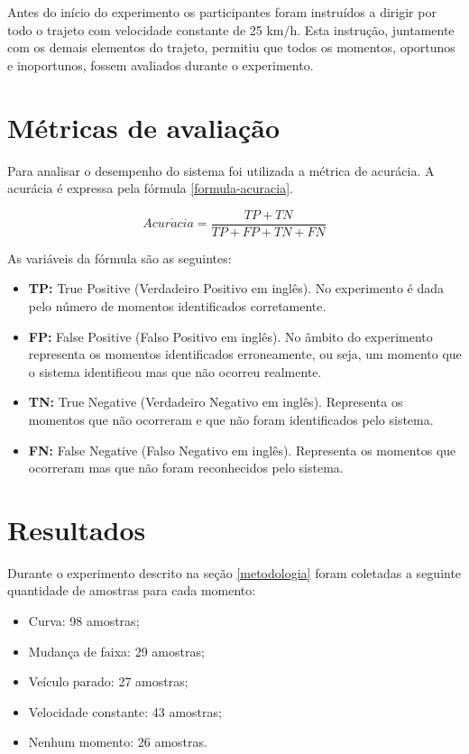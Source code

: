 Antes do início do experimento os participantes foram instruídos a dirigir por todo o trajeto com
velocidade constante de 25 km/h. Esta instrução, juntamente com os demais elementos do trajeto,
permitiu que todos os momentos, oportunos e inoportunos, fossem avaliados durante o experimento.

\section{Métricas de avaliação}
\label{metricas}

Para analisar o desempenho do sistema foi utilizada a métrica de acurácia. A acurácia é expressa pela
fórmula \ref{formula-acuracia}.

\begin{equation}
  Acur\acute{a}cia = \frac{TP + TN}{TP + FP + TN + FN}
\label{formula-acuracia}
\end{equation}

As variáveis da fórmula são as seguintes:

\begin{itemize}
  \item \textbf{TP:} True Positive (Verdadeiro Positivo em inglês). No experimento é dada pelo número de
  momentos identificados corretamente.
  \item \textbf{FP:} False Positive (Falso Positivo em inglês). No âmbito do experimento representa os
  momentos identificados erroneamente, ou seja, um momento que o sistema identificou mas que não ocorreu
  realmente.
  \item \textbf{TN:} True Negative (Verdadeiro Negativo em inglês). Representa os momentos que não ocorreram
  e que não foram identificados pelo sistema.
  \item \textbf{FN:} False Negative (Falso Negativo em inglês). Representa os momentos que ocorreram mas
  que não foram reconhecidos pelo sistema.
\end{itemize}

\section{Resultados}
\label{resultados}

Durante o experimento descrito na seção \ref{metodologia} foram coletadas a seguinte quantidade de amostras para cada momento:

\begin{itemize}
  \item Curva: 98 amostras;
  \item Mudança de faixa: 29 amostras;
  \item Veículo parado: 27 amostras;
  \item Velocidade constante: 43 amostras;
  \item Nenhum momento: 26 amostras.
\end{itemize}

